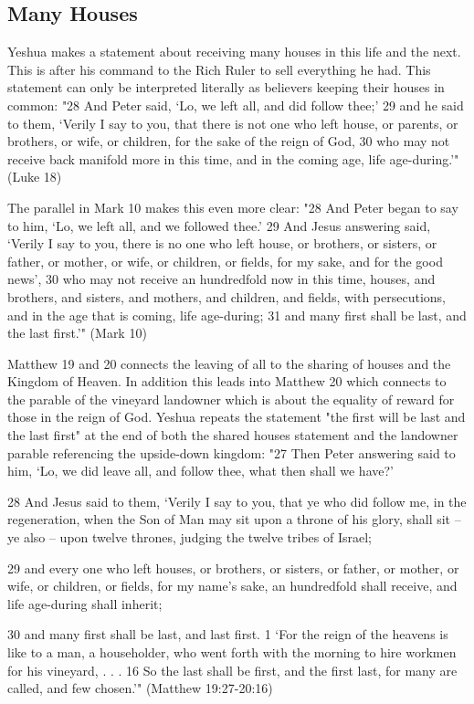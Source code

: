\documentclass[11pt]{article}
\begin{document}
\subsection{Many Houses}
Yeshua makes a statement about receiving many houses in this life and the next. This is after his command to the Rich Ruler to sell everything he had. This statement can only be interpreted literally as believers keeping their houses in common:
"28 And Peter said, `Lo, we left all, and did follow thee;' 29 and he said to them, `Verily I say to you, that there is not one who left house, or parents, or brothers, or wife, or children, for the sake of the reign of God, 30 who may not receive back manifold more in this time, and in the coming age, life age-during.'" (Luke 18)

The parallel in Mark 10 makes this even more clear:
"28 And Peter began to say to him, `Lo, we left all, and we followed thee.'
29 And Jesus answering said, `Verily I say to you, there is no one who left house, or brothers, or sisters, or father, or mother, or wife, or children, or fields, for my sake, and for the good news',
30 who may not receive an hundredfold now in this time, houses, and brothers, and sisters, and mothers, and children, and fields, with persecutions, and in the age that is coming, life age-during;
31 and many first shall be last, and the last first.'" (Mark 10)

Matthew 19 and 20 connects the leaving of all to the sharing of houses and the Kingdom of Heaven. In addition this leads into Matthew 20 which connects to the parable of the vineyard landowner which is about the equality of reward for those in the reign of God. Yeshua repeats the statement "the first will be last and the last first" at the end of both the shared houses statement and the landowner parable referencing the upside-down kingdom:
"27 Then Peter answering said to him, `Lo, we did leave all, and follow thee, what then shall we have?'

28 And Jesus said to them, `Verily I say to you, that ye who did follow me, in the regeneration, when the Son of Man may sit upon a throne of his glory, shall sit -- ye also -- upon twelve thrones, judging the twelve tribes of Israel;

29 and every one who left houses, or brothers, or sisters, or father, or mother, or wife, or children, or fields, for my name's sake, an hundredfold shall receive, and life age-during shall inherit;

30 and many first shall be last, and last first.
1 `For the reign of the heavens is like to a man, a householder, who went forth with the morning to hire workmen for his vineyard, . . .  16 So the last shall be first, and the first last, for many are called, and few chosen.'" (Matthew 19:27-20:16)
\end{document}
